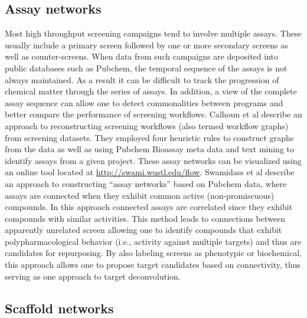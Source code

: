 \documentclass[12pt,letterpaper]{article}
\begin{document}
\subsection{Assay networks}
\label{sec:assay-networks}

Most high throughput screening campaigns tend to involve multiple
assays. These usually include a primary screen followed by one or more
secondary screens as well as counter-screens. When data from such
campaigns are deposited into public databases such as Pubchem, the
temporal sequence of the assays is not always maintained. As a result
it can be difficult to track the progression of chemical matter
through the series of assays. In addition, a view of the complete
assay sequence can allow one to detect commonalities between programs
and better compare the performance of screening workflows. Calhoun et
al \cite{Calhoun:2012uq} describe an approach to reconstructing
screening workflows (also termed workflow graphs) from screening
datasets. They employed four heuristic rules to construct graphs from
the data as well as using Pubchem Bioassay meta data and text mining
to identify assays from a given project. These assay networks can be
visualized using an online tool located at
\href{http://swami.wustl.edu/flow}{http://swami.wustl.edu/flow}.
Swamidass et al \cite{Swamidass:2014vn} describe an approach to
constructing ``assay networks'' based on Pubchem data, where assays
are connected when they exhibit common active (non-promiscuous)
compounds. In this approach connected assays are correlated since they
exhibit compounds with similar activities. This method leads to
connections between apparently unrelated screen allowing one to
identify compounds that exhibit polypharmacological behavior (i.e.,
activity against multiple targets) and thus are candidates for
repurposing. By also labeling screens as phenotypic or biochemical,
this approach allows one to propose target candidates based on
connectivity, thus serving as one approach to target deconvolution.

\subsection{Scaffold networks}
\label{sec:scaffold-networks}
\end{document}
